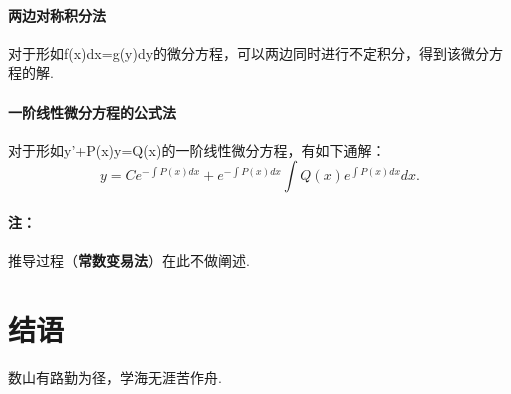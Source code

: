 \documentclass[12pt, a4paper, oneside]{ctexart}
\begin{document}
\paragraph{两边对称积分法}对于形如f(x)dx=g(y)dy的微分方程，可以两边同时进行不定积分，得到该微分方程的解.
\paragraph{一阶线性微分方程的公式法}对于形如y'+P(x)y=Q(x)的一阶线性微分方程，有如下通解：
\begin{equation}
	y=Ce_{}^{-\int P(x)dx}+e_{}^{-\int P(x)dx}\int Q(x)e_{}^{\int P(x)dx}dx.
\end{equation}
\paragraph{注：}推导过程（\textbf{常数变易法}）在此不做阐述.

\newpage
\section{结语}
数山有路勤为径，学海无涯苦作舟.
\end{document}
